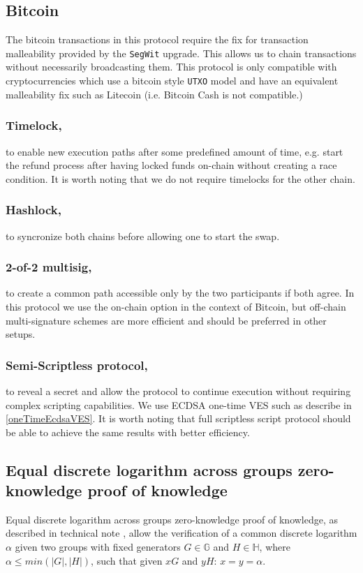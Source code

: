 \documentclass{llncs}
\newcommand{\GG}{\mathbb{G}}
\newcommand{\HH}{\mathbb{H}}
\begin{document}
\subsection{Bitcoin}
\label{bitcoinPrerequisites}
The bitcoin transactions in this protocol require the fix for transaction malleability provided by the \texttt{SegWit} upgrade.  This allows us to chain transactions without necessarily broadcasting them. This protocol is only compatible with cryptocurrencies which use a bitcoin style \texttt{UTXO} model and have an equivalent malleability fix such as Litecoin (i.e. Bitcoin Cash is not compatible.)

\subsubsection{Timelock,}
to enable new execution paths after some predefined amount of time, e.g. start the refund process after having locked funds on-chain without creating a race condition. It is worth noting that we do not require timelocks for the other chain.

\subsubsection{Hashlock,}
to syncronize both chains before allowing one to start the swap.

\subsubsection{2-of-2 multisig,}
to create a common path accessible only by the two participants if both agree. In this protocol we use the on-chain option in the context of Bitcoin, but off-chain multi-signature schemes are more efficient and should be preferred in other setups.

\subsubsection{Semi-Scriptless protocol,}
to reveal a secret and allow the protocol to continue execution without requiring complex scripting capabilities. We use ECDSA one-time VES such as describe in \ref{oneTimeEcdsaVES}. It is worth noting that full scriptless script protocol should be able to achieve the same results with better efficiency.

\subsection{Equal discrete logarithm across groups zero-knowledge proof of knowledge}
Equal discrete logarithm across groups zero-knowledge proof of knowledge, as described in technical note \cite{MRL0010}, allow the verification of a common discrete logarithm $\alpha$ given two groups with fixed generators $G \in \GG$ and $H \in \HH$, where $\alpha \leq min(|G|,|H|)$, such that given $xG$ and $yH$: $x=y=\alpha$. 
\end{document}
